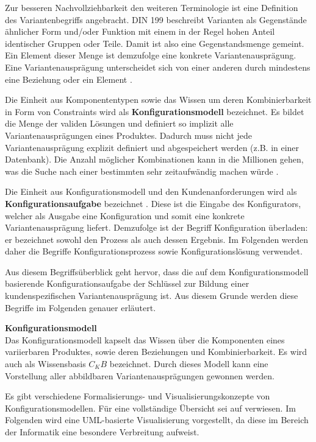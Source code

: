 \documentclass[12pt,a4paper,bibliography=totocnumbered,listof=totoc]{scrartcl}
\begin{document}
Zur besseren Nachvollziehbarkeit den weiteren Terminologie ist eine Definition des Variantenbegriffs angebracht. DIN 199 beschreibt Varianten als \glqq Gegenstände ähnlicher Form und/oder Funktion mit einem in der Regel hohen Anteil identischer Gruppen oder Teile\grqq{}. Damit ist also eine Gegenstandsmenge gemeint. Ein Element dieser Menge ist demzufolge eine konkrete Variantenausprägung. Eine Variantenausprägung unterscheidet sich von einer anderen durch mindestens eine Beziehung oder ein Element \citep{lutz11}.

Die Einheit aus Komponententypen sowie das Wissen um deren Kombinierbarkeit in Form von Constraints wird als \textbf{Konfigurationsmodell} bezeichnet. Es bildet die Menge der validen Lösungen und definiert so implizit alle Variantenausprägungen eines Produktes. Dadurch muss nicht jede Variantenausprägung explizit definiert und abgespeichert werden (z.B. in einer Datenbank). Die Anzahl möglicher Kombinationen kann in die Millionen gehen, was die Suche nach einer bestimmten sehr zeitaufwändig machen würde \citep{falkner11}.

Die Einheit aus Konfigurationsmodell und den Kundenanforderungen wird als \textbf{Konfigurationsaufgabe} bezeichnet \citep{felferning14}. Diese ist die Eingabe des Konfigurators, welcher als Ausgabe eine Konfiguration und somit eine konkrete Variantenausprägung liefert. Demzufolge ist der Begriff Konfiguration überladen: er bezeichnet sowohl den Prozess als auch dessen Ergebnis. Im Folgenden werden daher die Begriffe Konfigurationsprozess sowie Konfigurationslösung verwendet.

Aus diesem Begriffsüberblick geht hervor, dass die auf dem Konfigurationsmodell basierende Konfigurationsaufgabe der Schlüssel zur Bildung einer kundenspezifischen Variantenausprägung ist. Aus diesem Grunde werden diese Begriffe im Folgenden  genauer erläutert.

\textbf{Konfigurationsmodell}\\
Das Konfigurationsmodell kapselt das Wissen über die Komponenten eines variierbaren Produktes, sowie deren Beziehungen und Kombinierbarkeit. Es wird auch als Wissensbasis $C_KB$ bezeichnet. Durch dieses Modell kann eine Vorstellung aller abbildbaren Variantenausprägungen gewonnen werden.

Es gibt verschiedene Formalisierungs- und Visualisierungskonzepte von Konfigurationsmodellen. Für eine vollständige Übersicht sei auf \citet{felferning14} verwiesen. Im Folgenden wird eine UML-basierte Visualisierung vorgestellt, da diese im Bereich der Informatik eine besondere Verbreitung aufweist.
\end{document}
